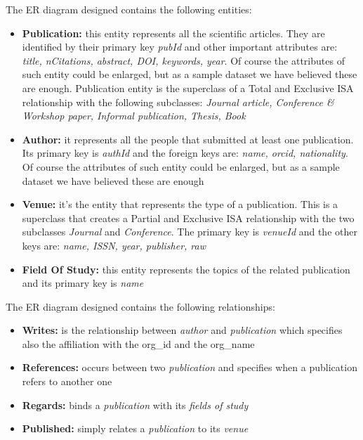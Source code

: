 \documentclass{Configuration_Files/PoliMi3i_thesis}
\begin{document}
\newpage
The ER diagram designed contains the following entities:
\begin{itemize}
    \item \textbf{Publication:} this entity represents all the scientific articles. They are identified by their primary key \emph{pubId}
            and other important attributes are: \emph{title, nCitations, abstract, DOI, keywords, year}.
            Of course the attributes of such entity could be enlarged, but as a sample dataset we have believed these are enough.
            Publication entity is the superclass of a Total and Exclusive ISA relationship with the following subclasses:
            \emph{Journal article, Conference \& Workshop paper, Informal publication, Thesis, Book}
    \item \textbf{Author:} it represents all the people that submitted at least one publication. Its primary key is \emph{authId} and the
            foreign keys are: \emph{name, orcid, nationality}.
            Of course the attributes of such entity could be enlarged, but as a sample dataset we have believed these are enough
    \item \textbf{Venue:} it's the entity that represents the type of a publication. This is a superclass that creates a Partial and Exclusive
            ISA relationship with the two subclasses \emph{Journal} and \emph{Conference}.
            The primary key is \emph{venueId} and the other keys are: \emph{name, ISSN, year, publisher, raw}
    \item \textbf{Field Of Study:} this entity represents the topics of the related publication and its primary key is \emph{name}
\end{itemize}
\bigskip

The ER diagram designed contains the following relationships:
\begin{itemize}
    \item \textbf{Writes:} is the relationship between \emph{author} and \emph{publication} which specifies also the affiliation
            with the org\_id and the org\_name
    \item \textbf{References:} occurs between two \emph{publication} and specifies when a publication refers to another one
    \item \textbf{Regards:} binds a \emph{publication} with its \emph{fields of study}
    \item \textbf{Published:} simply relates a \emph{publication} to its \emph{venue}
\end{itemize}
\end{document}
